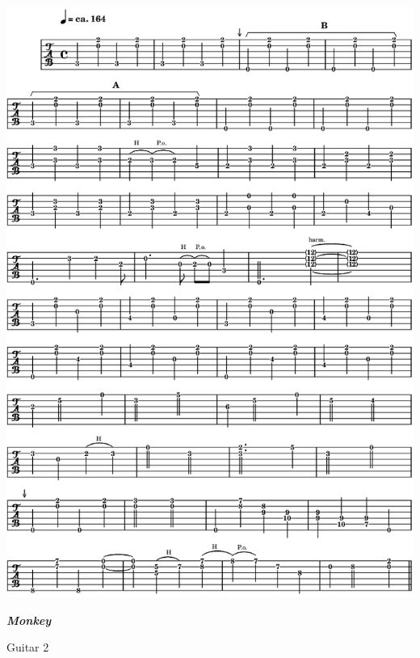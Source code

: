 \begin{center}
\includegraphics[width=\textwidth]{img/neD1}
\end{center}

\newpage
\textbf{\textsl{Monkey}}  

\smallskip

 \quad Guitar 2
 
